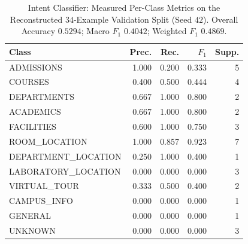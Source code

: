 \begin{table}[!t]
\centering
\caption{Intent Classifier: Measured Per-Class Metrics on the Reconstructed
$34$-Example Validation Split (Seed $42$). Overall Accuracy $0.5294$;
Macro $F_1$ $0.4042$; Weighted $F_1$ $0.4869$.}
\label{tab:lstmperclass}
\footnotesize
\renewcommand{\arraystretch}{1.12}
\begin{tabular}{@{}lrrrr@{}}
\toprule
\textbf{Class} & \textbf{Prec.} & \textbf{Rec.} & \textbf{$F_1$} & \textbf{Supp.} \\
\midrule
ADMISSIONS          & 1.000 & 0.200 & 0.333 & 5 \\
COURSES             & 0.400 & 0.500 & 0.444 & 4 \\
DEPARTMENTS         & 0.667 & 1.000 & 0.800 & 2 \\
ACADEMICS           & 0.667 & 1.000 & 0.800 & 2 \\
FACILITIES          & 0.600 & 1.000 & 0.750 & 3 \\
ROOM\_LOCATION      & 1.000 & 0.857 & 0.923 & 7 \\
DEPARTMENT\_LOCATION & 0.250 & 1.000 & 0.400 & 1 \\
LABORATORY\_LOCATION & 0.000 & 0.000 & 0.000 & 3 \\
VIRTUAL\_TOUR       & 0.333 & 0.500 & 0.400 & 2 \\
CAMPUS\_INFO        & 0.000 & 0.000 & 0.000 & 1 \\
GENERAL            & 0.000 & 0.000 & 0.000 & 1 \\
UNKNOWN            & 0.000 & 0.000 & 0.000 & 3 \\
\bottomrule
\end{tabular}
\end{table}
